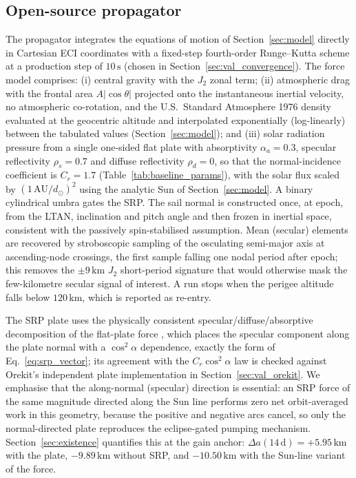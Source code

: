 \subsection{Open-source propagator}
\label{sec:val_propagator}
\noindent The propagator integrates the equations of motion of Section~\ref{sec:model} directly in Cartesian ECI coordinates with a fixed-step fourth-order Runge--Kutta scheme at a production step of \(10\,\mathrm{s}\) (chosen in Section~\ref{sec:val_convergence}). The force model comprises: (i) central gravity with the \(J_2\) zonal term; (ii) atmospheric drag with the frontal area \(A\lvert\cos\theta\rvert\) projected onto the instantaneous inertial velocity, no atmospheric co-rotation, and the U.S.\ Standard Atmosphere 1976 density \citep{USSA1976} evaluated at the geocentric altitude and interpolated exponentially (log-linearly) between the tabulated values (Section~\ref{sec:model}); and (iii) solar radiation pressure from a single one-sided flat plate with absorptivity \(\alpha_a = 0.3\), specular reflectivity \(\rho_s = 0.7\) and diffuse reflectivity \(\rho_d = 0\), so that the normal-incidence coefficient is \(C_r = 1.7\) (Table~\ref{tab:baseline_params}), with the solar flux scaled by \((1\,\mathrm{AU}/d_{\odot})^2\) using the analytic Sun of Section~\ref{sec:model}. A binary cylindrical umbra gates the SRP. The sail normal is constructed once, at epoch, from the LTAN, inclination and pitch angle and then frozen in inertial space, consistent with the passively spin-stabilised assumption. Mean (secular) elements are recovered by stroboscopic sampling of the osculating semi-major axis at ascending-node crossings, the first sample falling one nodal period after epoch; this removes the \(\pm 9\,\mathrm{km}\) \(J_2\) short-period signature that would otherwise mask the few-kilometre secular signal of interest. A run stops when the perigee altitude falls below \(120\,\mathrm{km}\), which is reported as re-entry.

\vspace{5pt}
\par\noindent The SRP plate uses the physically consistent specular/diffuse/absorptive decomposition of the flat-plate force \citep{mcmahonSchereesSRP2010,montenbruckGill2000}, which places the specular component along the plate normal with a \(\cos^2\alpha\) dependence, exactly the form of Eq.~\eqref{eq:srp_vector}; its agreement with the \(C_r\cos^2\alpha\) law is checked against Orekit's independent plate implementation in Section~\ref{sec:val_orekit}. We emphasise that the along-normal (specular) direction is essential: an SRP force of the same magnitude directed along the Sun line performs zero net orbit-averaged work in this geometry, because the positive and negative arcs cancel, so only the normal-directed plate reproduces the eclipse-gated pumping mechanism. Section~\ref{sec:existence} quantifies this at the gain anchor: \(\Delta a(14\,\mathrm{d}) = +5.95\,\mathrm{km}\) with the plate, \(-9.89\,\mathrm{km}\) without SRP, and \(-10.50\,\mathrm{km}\) with the Sun-line variant of the force.

